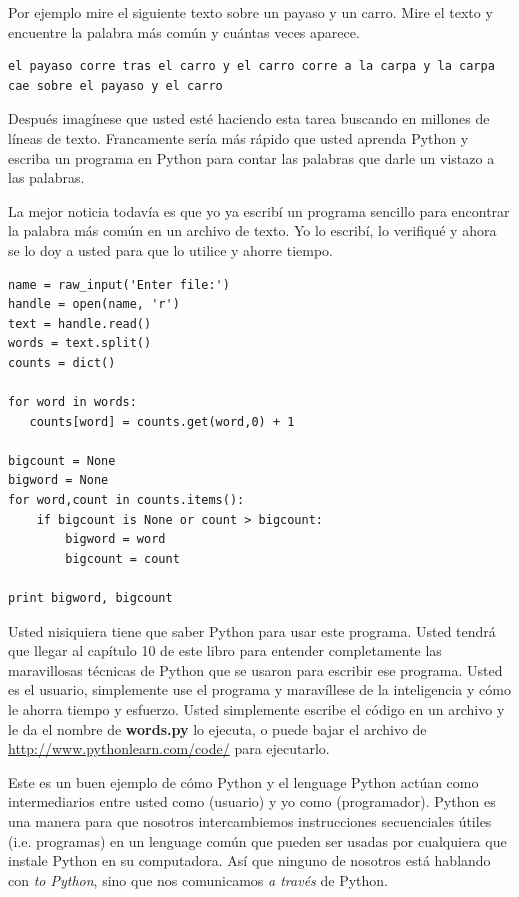 Por ejemplo mire el siguiente texto sobre un payaso y un carro. Mire el texto y encuentre la palabra m\'as com\'un y cu\'antas veces aparece.

\beforeverb
\begin{verbatim}
el payaso corre tras el carro y el carro corre a la carpa y la carpa cae sobre el payaso y el carro
\end{verbatim}
\afterverb
%
Despu\'es imag\'inese que usted est\'e haciendo esta tarea buscando en millones de l\'ineas de texto. 
Francamente ser\'ia m\'as r\'apido que usted aprenda Python y escriba un programa en Python para contar las palabras que darle un vistazo a las palabras.

La mejor noticia todav\'ia es que yo ya escrib\'i un programa sencillo para encontrar la palabra m\'as com\'un en un archivo de texto. Yo lo escrib\'i, lo verifiqu\'e y ahora se lo doy a usted para que lo utilice y ahorre tiempo.

\beforeverb
\begin{verbatim}
name = raw_input('Enter file:')
handle = open(name, 'r')
text = handle.read()
words = text.split()
counts = dict()

for word in words:
   counts[word] = counts.get(word,0) + 1

bigcount = None
bigword = None
for word,count in counts.items():
    if bigcount is None or count > bigcount:
        bigword = word
        bigcount = count

print bigword, bigcount
\end{verbatim}
\afterverb
%
Usted nisiquiera tiene que saber Python para usar este programa. Usted tendr\'a que llegar al cap\'itulo 10 de este libro para entender completamente las maravillosas t\'ecnicas de Python que se usaron para escribir ese programa. Usted es el usuario, simplemente use el programa y marav\'illese de la inteligencia y c\'omo le ahorra tiempo y esfuerzo.
Usted simplemente escribe el c\'odigo en un archivo y le da el nombre de  
{\bf words.py} lo ejecuta, o puede bajar el archivo de \url{http://www.pythonlearn.com/code/} para ejecutarlo.

Este es un buen ejemplo de c\'omo Python y el lenguage Python act\'uan como intermediarios entre usted
como (usuario) y yo como (programador). Python es una manera para que nosotros intercambiemos instrucciones secuenciales \'utiles (i.e. programas) en un lenguage com\'un que pueden ser usadas por cualquiera que instale Python en su computadora. As\'i que ninguno de nosotros est\'a hablando con {\em to Python},
sino que nos comunicamos {\em a trav\'es} de Python.

